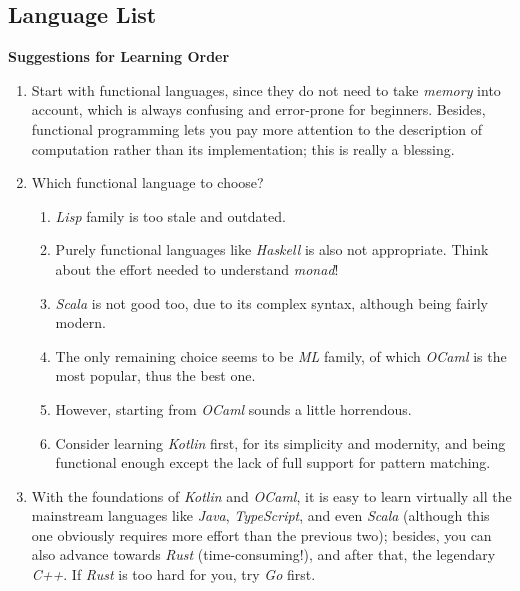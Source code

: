 \documentclass{article}
\begin{document}
\subsection{Language List}

\textbf{Suggestions for Learning Order}

\begin{enumerate}
    \item Start with functional languages, since they do not need to take \emph{memory} into account, which is always confusing and error-prone for beginners.
    Besides, functional programming lets you pay more attention to the description of computation rather than its implementation; this is really a blessing.
    \item Which functional language to choose?
    \begin{enumerate}
        \item \emph{Lisp} family is too stale and outdated.
        \item Purely functional languages like \emph{Haskell} is also not appropriate.
        Think about the effort needed to understand \emph{monad}!
        \item \emph{Scala} is not good too, due to its complex syntax, although being fairly modern.
        \item The only remaining choice seems to be \emph{ML} family, of which \emph{OCaml} is the most popular, thus the best one.
        \item However, starting from \emph{OCaml} sounds a little horrendous.
        \item Consider learning \emph{Kotlin} first, for its simplicity and modernity, and being functional enough except the lack of full support for pattern matching.
    \end{enumerate}
    \item With the foundations of \emph{Kotlin} and \emph{OCaml}, it is easy to learn virtually all the mainstream languages like \emph{Java}, \emph{TypeScript}, and even \emph{Scala} (although this one obviously requires more effort than the previous two); besides, you can also advance towards \emph{Rust} (time-consuming!), and after that, the legendary \emph{C++}.
    If \emph{Rust} is too hard for you, try \emph{Go} first.
\end{enumerate}
\end{document}
